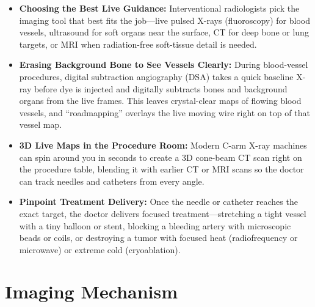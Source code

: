 \begin{itemize}
    \item \textbf{Choosing the Best Live Guidance:} Interventional radiologists pick the imaging tool that best fits the job---live pulsed X-rays (fluoroscopy) for blood vessels, ultrasound for soft organs near the surface, CT for deep bone or lung targets, or MRI when radiation-free soft-tissue detail is needed.
    \item \textbf{Erasing Background Bone to See Vessels Clearly:} During blood-vessel procedures, digital subtraction angiography (DSA) takes a quick baseline X-ray before dye is injected and digitally subtracts bones and background organs from the live frames. This leaves crystal-clear maps of flowing blood vessels, and ``roadmapping'' overlays the live moving wire right on top of that vessel map.
    \item \textbf{3D Live Maps in the Procedure Room:} Modern C-arm X-ray machines can spin around you in seconds to create a 3D cone-beam CT scan right on the procedure table, blending it with earlier CT or MRI scans so the doctor can track needles and catheters from every angle.
    \item \textbf{Pinpoint Treatment Delivery:} Once the needle or catheter reaches the exact target, the doctor delivers focused treatment---stretching a tight vessel with a tiny balloon or stent, blocking a bleeding artery with microscopic beads or coils, or destroying a tumor with focused heat (radiofrequency or microwave) or extreme cold (cryoablation).
\end{itemize}

\section{Imaging Mechanism}

